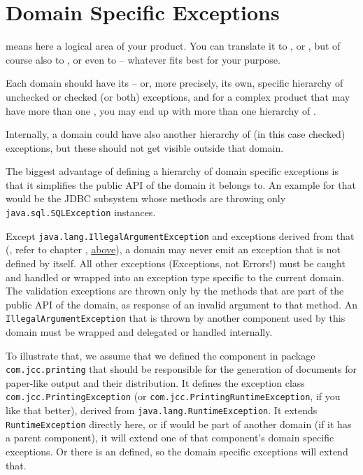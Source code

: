 \section{Domain Specific Exceptions}\label{sec:DomainSpecificExceptions}
 means here a logical area of your product. You can translate it to ,  or , but of course also to ,  or even to  – whatever fits best for your purpose.

Each domain should have its  – or, more precisely, its own, specific hierarchy of unchecked or checked (or both) exceptions, and for a complex product that may have more than one , you may end up with more than one hierarchy of .

Internally, a domain could have also another hierarchy of (in this case checked) exceptions, but these should not get visible outside that domain.

The biggest advantage of defining a hierarchy of domain specific exceptions is that it simplifies the public API of the domain it belongs to. An example for that would be the JDBC subsystem \autocite{ORACLE_DOC_SQL_PACKAGE,WIKIPEDIA:JDBC,DEV_TO:JDBC} whose methods are throwing only \lstinline|java.sql.SQLException| \autocite{ORACLE_DOC_SQLEXCEPTION_CLASS} instances.

Except \lstinline|java.lang.IllegalArgumentException| and exceptions derived from that (, refer to chapter , \hyperref[sec:ValidationExceptions]{above}), a domain may never emit an exception that is not defined by itself. All other exceptions (Exceptions, not Errors!) must be caught and handled or wrapped into an exception type specific to the current domain. The validation exceptions are thrown only by the methods that are part of the public API of the domain, as response of an invalid argument to that method. An \lstinline|IllegalArgumentException| that is thrown by another component used by this domain must be wrapped and delegated or handled internally.

To illustrate that, we assume that we defined the component  in package \lstinline|com.jcc.printing| that should be responsible for the generation of documents for paper-like output and their distribution. It defines the exception class \lstinline|com.jcc.PrintingException| (or \lstinline|com.jcc.PrintingRuntimeException|, if you like that better), derived from \lstinline|java.lang.RuntimeException|. It extends \lstinline|RuntimeException| directly here, or if  would be part of another domain (if it has a parent component), it will extend one of that component’s domain specific exceptions. Or there is an   defined, so the domain specific exceptions will extend that.

